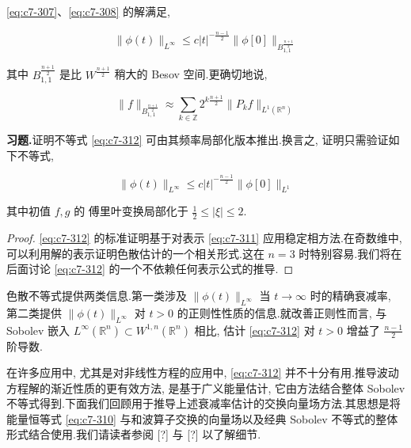 \begin{proposition}[色散不等式]\label{prop:c7-0.24}
\eqref{eq:c7-307}、\eqref{eq:c7-308} 的解满足,

\begin{equation}
\|\phi(t)\|_{L^{\infty}} \leq c|t|^{-\frac{n-1}{2}}\|\phi[0]\|_{B_{1, 1}^{\frac{n+1}{2}}}\label{eq:c7-312}
\end{equation}

其中 $B_{1, 1}^{\frac{n+1}{2}}$ 是比 $W^{\frac{n+1}{2}}$ 稍大的 Besov 空间.更确切地说,

\[
\|f\|_{B_{1, 1}^{\frac{n+1}{2}}} \approx \sum_{k\in\mathbb{Z}}2^{k\frac{n+1}{2}}\|P_k f\|_{L^1(\mathbb{R}^n)}
\]
\end{proposition}

\noindent\textbf{习题.}\quad 证明不等式 \eqref{eq:c7-312} 可由其频率局部化版本推出.换言之, 证明只需验证如下不等式,

\begin{equation}
\|\phi(t)\|_{L^{\infty}} \leq c|t|^{-\frac{n-1}{2}}\|\phi[0]\|_{L^1}\label{eq:c7-313}
\end{equation}

其中初值 $f, g$ 的 傅里叶变换局部化于 $\frac{1}{2}\leq|\xi|\leq 2$.

\begin{proof}
\eqref{eq:c7-312} 的标准证明基于对表示 \eqref{eq:c7-311} 应用稳定相方法.在奇数维中, 可以利用解的表示证明色散估计的一个相关形式.这在 $n = 3$ 时特别容易.我们将在后面讨论 \eqref{eq:c7-312} 的一个不依赖任何表示公式的推导.
\end{proof}

\begin{remark}\label{rem:c7-0.25}
色散不等式提供两类信息.第一类涉及 $\|\phi(t)\|_{L^{\infty}}$ 当 $t\to\infty$ 时的精确衰减率, 第二类提供 $\|\phi(t)\|_{L^{\infty}}$ 对 $t>0$ 的正则性性质的信息.就改善正则性而言, 与 Sobolev 嵌入 $L^{\infty}(\mathbb{R}^n)\subset W^{1, n}(\mathbb{R}^n)$ 相比, 估计 \eqref{eq:c7-312} 对 $t>0$ 增益了 $\frac{n-1}{2}$ 阶导数.
\end{remark}

在许多应用中, 尤其是对非线性方程的应用中, \eqref{eq:c7-312} 并不十分有用.推导波动方程解的渐近性质的更有效方法, 是基于广义能量估计, 它由方法结合整体 Sobolev 不等式得到.下面我们回顾用于推导上述衰减率估计的交换向量场方法.其思想是将能量恒等式 \eqref{eq:c7-310} 与和波算子交换的向量场以及经典 Sobolev 不等式的整体形式结合使用.我们请读者参阅 [?] 与 [?] 以了解细节.

